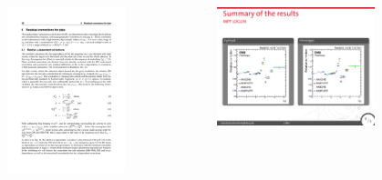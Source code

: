 {\begin{columns}[T]
\begin{block}{}
			\end{block}
		\vspace*{-0.2cm}
		\begin{figure}[T]
			\centering
			\includegraphics[width=3.5cm]{images/l2equations.pdf}%
			\label{fig:L2Residual}
		\end{figure}
                \vspace{-.75cm}
		\begin{figure}[T]
			\centering
			\includegraphics[width=4.7cm]{images/l2res.pdf}%
			\label{fig:L2Residual}
		\end{figure}
	\end{columns}
}
